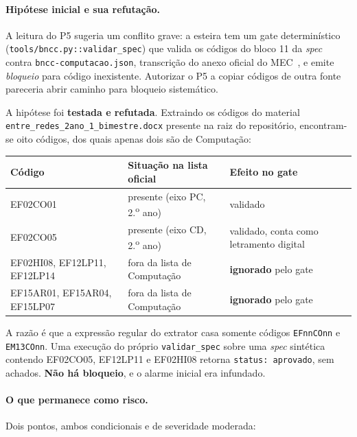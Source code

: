 \documentclass[11pt,a4paper]{article}
\newcommand{\cod}[1]{\texttt{\small #1}}
\begin{document}
\paragraph{Hipótese inicial e sua refutação.} A leitura do P5 sugeria um conflito grave: a esteira tem um
gate determinístico (\cod{tools/bncc.py::validar\_spec}) que valida os códigos do bloco 11 da \textit{spec}
contra \cod{bncc-computacao.json}, transcrição do anexo oficial do MEC~\cite{cne2022}, e emite
\textit{bloqueio} para código inexistente. Autorizar o P5 a copiar códigos de outra fonte pareceria abrir
caminho para bloqueio sistemático.

A hipótese foi \textbf{testada e refutada}. Extraindo os códigos do material \cod{entre\_redes\_2ano\_1\_bimestre.docx}
presente na raiz do repositório, encontram-se oito códigos, dos quais apenas dois são de Computação:

\begin{center}
\begin{tabular}{lll}
\toprule
\textbf{Código} & \textbf{Situação na lista oficial} & \textbf{Efeito no gate} \\
\midrule
EF02CO01 & presente (eixo PC, 2.\textsuperscript{o} ano) & validado \\
EF02CO05 & presente (eixo CD, 2.\textsuperscript{o} ano) & validado, conta como letramento digital \\
EF02HI08, EF12LP11, EF12LP14 & fora da lista de Computação & \textbf{ignorado} pelo gate \\
EF15AR01, EF15AR04, EF15LP07 & fora da lista de Computação & \textbf{ignorado} pelo gate \\
\bottomrule
\end{tabular}
\end{center}

A razão é que a expressão regular do extrator casa somente códigos \cod{EFnnCOnn} e \cod{EM13COnn}. Uma
execução do próprio \cod{validar\_spec} sobre uma \textit{spec} sintética contendo EF02CO05, EF12LP11 e
EF02HI08 retorna \cod{status: aprovado}, sem achados. \textbf{Não há bloqueio}, e o alarme inicial era
infundado.

\paragraph{O que permanece como risco.} Dois pontos, ambos condicionais e de severidade moderada:
\end{document}
